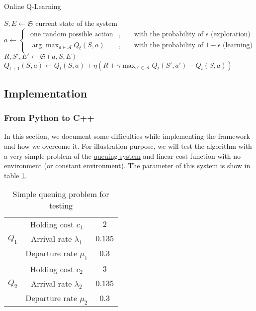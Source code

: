 \documentclass[
  a4paper, xcolor = usenames,dvipsnames]{article}
\theoremstyle{definition}
\theoremstyle{definition}
\theoremstyle{definition}
\theoremstyle{definition}
\theoremstyle{remark}
\begin{document}
\begin{algorithm}
\caption{Online Q-Learning}\label{alg:on-q-learning}
 {
  $S, E \gets \mathfrak{S}$ current state of the system\;
  $a \gets 
    \begin{cases}
    \begin{aligned}
      \text{one random possible action}&, && \text{ with the probability of } \epsilon \text{ (exploration)}\\ 
      \arg\max_{a \in \mathcal{A}} Q_{t}(S, a)&, && \text{ with the probability of } 1 - \epsilon \text{ (learning)}
    \end{aligned}
    \end{cases}
  $\\
  $R, S', E' \gets \mathfrak{S}(a, S, E)$\;
  $Q_{t+1}(S, a) \gets Q_{t}(S, a) + \eta (R + \gamma \max_{a' \in \mathcal{A}} Q_{t}(S', a') - Q_{t}(S, a))$ \;
}
\end{algorithm}

\hypertarget{implementation}{%
\subsection{Implementation}\label{implementation}}

\hypertarget{from-python-to-c}{%
\subsubsection{From Python to C++}\label{from-python-to-c}}

In this section, we document some difficulties while implementing the framework and how we overcome it. For illustration purpose, we will test the algorithm with a very simple problem of the \protect\hyperlink{queuing-system}{queuing system}
and linear cost function with no environment (or constant environment). The parameter of this system is show in table \ref{tab:q-learning-test}.

\begin{table}[!htbp]
\caption{Simple queuing problem for testing}
\begin{center}
\begin{tabular}{c c c}
    \hline
    \multirow{3}{*}{$Q_{1}$} & Holding cost $c_{1}$ & $2$ \\
    & Arrival rate $\lambda_{1}$ & $0.135$ \\
    & Departure rate $\mu_{1}$ & $0.3$ \\
    \cline{2-3}
    \multirow{3}{*}{$Q_{2}$} & Holding cost $c_{2}$ & $3$ \\
    & Arrival rate $\lambda_{2}$ & $0.135$ \\
    & Departure rate $\mu_{2}$ & $0.3$ \\    
    \hline
\end{tabular}
\end{center}
\label{tab:q-learning-test}
\end{table}
\end{document}
